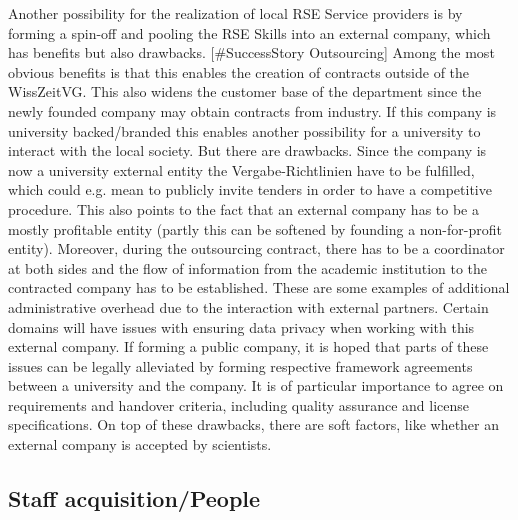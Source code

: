 \documentclass{article}
\begin{document}
Another possibility for the realization of local RSE Service providers is by forming a spin-off and pooling the RSE Skills into an external company, which has benefits but also drawbacks. [\#SuccessStory Outsourcing]
Among the most obvious benefits is that this enables the creation of contracts outside of the WissZeitVG.
This also widens the customer base of the department since the newly founded company may obtain contracts from industry.
If this company is university backed/branded this enables another possibility for a university to interact with the local society. 
But there are drawbacks.
Since the company is now a university external entity the Vergabe-Richtlinien have to be fulfilled, which could e.g. mean to publicly invite tenders in order to have a competitive procedure.
This also points to the fact that an external company has to be a mostly profitable entity (partly this can be softened by founding a non-for-profit entity).
Moreover, during the outsourcing contract, there has to be a coordinator at both sides and the flow of information from the academic institution to the contracted company has to be established.
These are some examples of additional administrative overhead due to the interaction with external partners.
Certain domains will have issues with ensuring data privacy when working with this external company.
If forming a public company, it is hoped that parts of these issues can be legally alleviated by forming respective framework agreements between a university and the company.
It is of particular importance to agree on requirements and handover criteria, including quality assurance and license specifications.
On top of these drawbacks, there are soft factors, like whether an external company is accepted by scientists.

\subsection{Staff acquisition/People}
\end{document}
